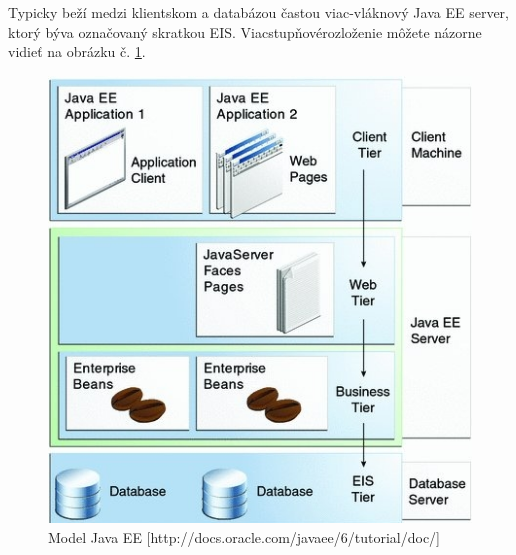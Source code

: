 Typicky beží medzi klientskom a databázou častou viac-vláknový Java EE server, ktorý býva označovaný skratkou EIS. Viacstupňovérozloženie môžete názorne vidieť na obrázku č. \ref{model}.
\begin{figure}[htb]

\begin{center}

\includegraphics[scale=0.5]{model.jpg} 
\caption{Model Java EE [http://docs.oracle.com/javaee/6/tutorial/doc/]}
\label{model}

\end{center}

\end{figure}
